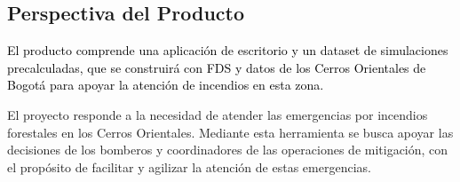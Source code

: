 \subsection{Perspectiva del Producto}
{\color{black}\textcolor{black}{El producto comprende una aplicación de escritorio y un dataset de simulaciones precalculadas, que se construirá con FDS y datos de los Cerros Orientales de Bogotá para apoyar la atención de incendios en esta zona.}

El proyecto responde a la necesidad de atender las emergencias por incendios forestales en los Cerros Orientales. Mediante esta herramienta se busca apoyar las decisiones de los bomberos y coordinadores de las operaciones de mitigación, con el propósito de facilitar y agilizar la atención de estas emergencias.
}







